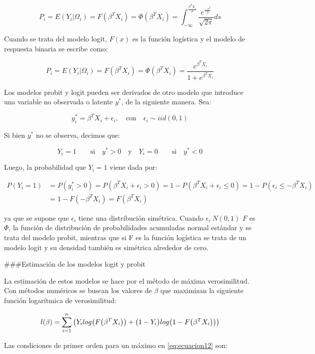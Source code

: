 \documentclass[
  12pt,
]{krantz}
\theoremstyle{definition}
\theoremstyle{definition}
\theoremstyle{definition}
\theoremstyle{remark}
\begin{document}
\[P_i=E(Y_i|\Omega_i)=F(\beta^TX_i)=\Phi(\beta^TX_i)=\int_{-\infty}^{\frac{\beta^TX_i}{\sigma}}\frac{e^{\frac{-s^2}{2}}}{\sqrt{2\pi}}ds
\label{eq:ecuacion8}\]

Cuando se trata del modelo logit, \(F(x)\) es la función logística y el modelo de respuesta binaria se escribe como:

\[P_i=E(Y_i|\Omega_i)=F(\beta^TX_i)=\Phi(\beta^TX_i)=\frac{e^{\beta^TX_i}}{1+e^{\beta^TX_i}}
\label{eq:ecuacion9}\]

Los modelos probit y logit pueden ser derivados de otro modelo que introduce una variable no observada o latente \(y^*\), de la siguiente manera. Sea:

\[y^*_i=\beta^TX_i+\epsilon_i, \quad \textrm{con} \quad \epsilon_i\sim iid(0,1)
\label{eq:ecuacion10}\]

Si bien \(y^*\) no se observa, decimos que:

\[Y_i=1\quad\quad\textrm{si} \quad y^*>0 \quad \textrm{y} \quad Y_i=0\quad\quad\textrm{si} \quad y^*<0
\label{eq:ecuacion11}\]

Luego, la probabilidad que \(Y_i=1\) viene dada por:

\begin{equation} \label{eq1}
\begin{split}
P(Y_i=1) & = P(y_i^*>0)=P(\beta^TX_i+\epsilon_i>0)= 1-P(\beta^TX_i+\epsilon_i\leq 0)=1-P(\epsilon_i\leq -\beta^TX_i)\\
 & = 1-F(-\beta^TX_i)=F(\beta^TX_i)
\end{split}
\end{equation}

ya que se supone que \(\epsilon_i\) tiene una distribución simétrica. Cuando \(\epsilon_i ~ N(0,1)\) \(F\) es \(\Phi\), la función de distribución de probabilidades acumuladas normal estándar y se trata del modelo probit, mientras que si F es la función logística se trata de un modelo logit y su densidad también es simétrica alrededor de cero.

\#\#\#Estimación de los modelos logit y probit

La estimación de estos modelos se hace por el método de máxima verosimilitud. Con métodos numéricos se buscan los valores de \(\beta\) que maximizan la siguiente función logarítmica de verosimilitud:

\[l(\beta)=\sum^{n}_{i=1}\big{(}Y_ilog\big{(}F\big{(}\beta^TX_i\big{)}\big{)}+\big{(}1-Y_i\big{)}log\big{(}1-F\big{(}\beta^TX_i\big{)}\big{)}\big{)}
\label{eq:ecuacion12}\]

Las condiciones de primer orden para un máximo en \eqref{eq:ecuacion12} son:
\end{document}
